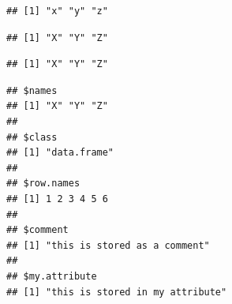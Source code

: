 \documentclass[krantz2]{krantz}\usepackage{knitr}
\begin{document}
\begin{knitrout}\footnotesize
{}\color{fgcolor}\begin{kframe}
\begin{alltt}
\end{alltt}
\begin{verbatim}
## [1] "x" "y" "z"
\end{verbatim}
\begin{alltt}
 \hlkwb{<-} \hlstd{(}
\end{alltt}
\begin{verbatim}
## [1] "X" "Y" "Z"
\end{verbatim}
\begin{alltt}
 \hlstd{)} 
\end{alltt}
\begin{verbatim}
## [1] "X" "Y" "Z"
\end{verbatim}
\begin{alltt}
 \hlstd{)} \hlkwb{<-} 
\end{alltt}
\begin{verbatim}
## $names
## [1] "X" "Y" "Z"
##
## $class
## [1] "data.frame"
##
## $row.names
## [1] 1 2 3 4 5 6
##
## $comment
## [1] "this is stored as a comment"
##
## $my.attribute
## [1] "this is stored in my attribute"
\end{verbatim}
\end{kframe}
\end{knitrout}
\end{document}
